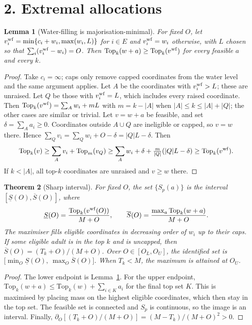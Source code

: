 \documentclass[11pt]{article}
\newtheorem{theorem}{Theorem}
\newtheorem{lemma}[theorem]{Lemma}
\theoremstyle{definition}
\begin{document}
\section*{2. Extremal allocations}
\begin{lemma}[Water-filling is majorisation-minimal]\label{lem:wf}
For fixed $O$, let $v^{\rm wf}_i=\min\{c_i+w_i,\max(w_i,L)\}$ for $i\in E$ and $v^{\rm wf}_i=w_i$ otherwise, with $L$ chosen
so that $\sum_i(v^{\rm wf}_i-w_i)=O$. Then $\mathrm{Top}_k(w+a)\ge\mathrm{Top}_k(v^{\rm wf})$ for every feasible $a$ and every $k$.
\end{lemma}
\begin{proof}
Take $c_i=\infty$; caps only remove capped coordinates from the water level and the same argument applies. Let $A$ be the
coordinates with $v^{\rm wf}_i>L$; these are unraised. Let $Q$ be those with $v^{\rm wf}_i=L$, which includes every raised
coordinate. Then $\mathrm{Top}_k(v^{\rm wf})=\sum_Aw_i+mL$ with $m=k-|A|$ when $|A|\le k\le|A|+|Q|$; the other cases are similar
or trivial. Let $v=w+a$ be feasible, and set $\delta=\sum_Aa_i\ge0$. Coordinates outside $A\cup Q$ are ineligible or capped,
so $v=w$ there. Hence $\sum_Qv_i=\sum_Qw_i+O-\delta=|Q|L-\delta$. Then
\[
\mathrm{Top}_k(v)\ge\sum_Av_i+\mathrm{Top}_m(v_Q)\ge\sum_Aw_i+\delta+\tfrac m{|Q|}(|Q|L-\delta)\ge\mathrm{Top}_k(v^{\rm wf}).
\]
If $k<|A|$, all top-$k$ coordinates are unraised and $v\ge w$ there.
\end{proof}

\begin{theorem}[Sharp interval]\label{thm:sharp}
For fixed $O$, the set $\{S_p(a)\}$ is the interval $[\underline S(O),\overline S(O)]$, where
\[
 \underline S(O)=\frac{\mathrm{Top}_k(v^{\rm wf}(O))}{M+O},\qquad
 \overline S(O)=\frac{\max_{a}\mathrm{Top}_k(w+a)}{M+O}.
\]
The maximiser fills eligible coordinates in decreasing order of $w_i$ up to their caps. If some eligible adult is in the top
$k$ and is uncapped, then $\overline S(O)=(T_k+O)/(M+O)$. Over $O\in[O_L,O_U]$, the identified set is
$\bigl[\min_O\underline S(O),\ \max_O\overline S(O)\bigr]$. When $T_k<M$, the maximum is attained at $O_U$.
\end{theorem}
\begin{proof}
The lower endpoint is Lemma~\ref{lem:wf}. For the upper endpoint, $\mathrm{Top}_k(w+a)\le\mathrm{Top}_k(w)+\sum_{i\in K}a_i$ for
the final top set $K$. This is maximised by placing mass on the highest eligible coordinates, which then stay in the top
set. The feasible set is connected and $S_p$ is continuous, so the image is an interval. Finally,
$\partial_O[(T_k+O)/(M+O)]=(M-T_k)/(M+O)^2>0$.
\end{proof}
\end{document}

